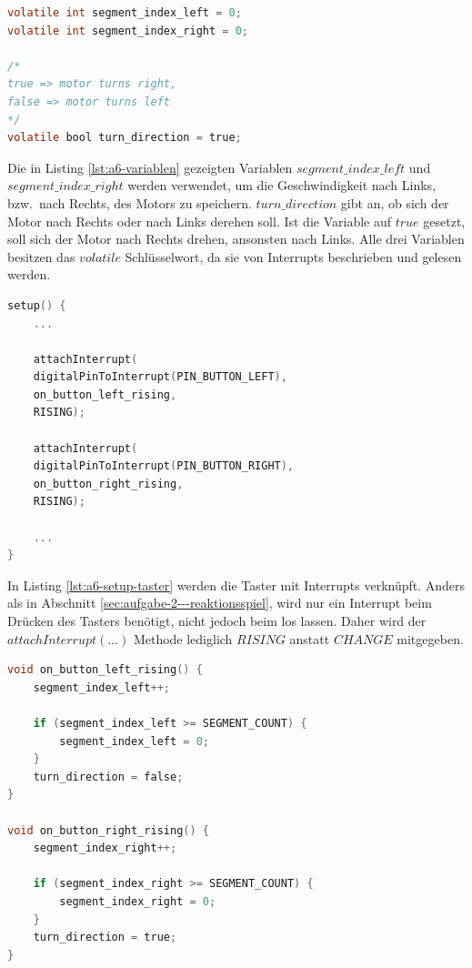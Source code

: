\begin{lstlisting}[language=C,label={lst:a6-variablen}, caption={Wichtige Variablen}]
volatile int segment_index_left = 0;
volatile int segment_index_right = 0;

/*
true => motor turns right,
false => motor turns left
*/
volatile bool turn_direction = true;
\end{lstlisting}

Die in Listing \ref{lst:a6-variablen} gezeigten Variablen $segment\_index\_left$ und $segment\_index\_right$ werden verwendet, um die Geschwindigkeit nach Links, bzw.\ nach Rechts, des Motors zu speichern.
$turn\_direction$ gibt an, ob sich der Motor nach Rechts oder nach Links derehen soll.
Ist die Variable auf $true$ gesetzt, soll sich der Motor nach Rechts drehen, ansonsten nach Links.
Alle drei Variablen besitzen das $volatile$ Schlüsselwort, da sie von Interrupts beschrieben und gelesen werden.

\begin{lstlisting}[language=C,label={lst:a6-setup-taster}, caption={Setup der Taster}]
setup() {
    ...

    attachInterrupt(
    digitalPinToInterrupt(PIN_BUTTON_LEFT),
    on_button_left_rising,
    RISING);

    attachInterrupt(
    digitalPinToInterrupt(PIN_BUTTON_RIGHT),
    on_button_right_rising,
    RISING);

    ...
}
\end{lstlisting}

In Listing \ref{lst:a6-setup-taster} werden die Taster mit Interrupts verknüpft.
Anders als in Abschnitt \ref{sec:aufgabe-2---reaktionsspiel}, wird nur ein Interrupt beim Drücken des Tasters benötigt, nicht jedoch beim los lassen.
Daher wird der $attachInterrupt(\dots)$ Methode lediglich $RISING$ anstatt $CHANGE$ mitgegeben.

\begin{lstlisting}[language=C,label={lst:a6-interrupts}, caption={Interrupts der Taster}]
void on_button_left_rising() {
    segment_index_left++;

    if (segment_index_left >= SEGMENT_COUNT) {
        segment_index_left = 0;
    }
    turn_direction = false;
}

void on_button_right_rising() {
    segment_index_right++;

    if (segment_index_right >= SEGMENT_COUNT) {
        segment_index_right = 0;
    }
    turn_direction = true;
}
\end{lstlisting}

